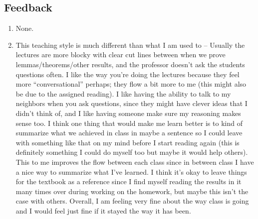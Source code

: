 \documentclass[11pt]{article}
\begin{document}
\subsection*{Feedback}
\begin{enumerate}
    \item None.
    \item This teaching style is much different than what I am used to -- Usually the lectures are more blocky with clear cut lines between when we prove lemmas/theorems/other results, and the professor doesn't ask the students questions often. I like the way you're doing the lectures because they feel more ``conversational'' perhaps; they flow a bit more to me (this might also be due to the assigned reading). I like having the ability to talk to my neighbors when you ask questions, since they might have clever ideas that I didn't think of, and I like having someone make sure my reasoning makes sense too. I think one thing that would make me learn better is to kind of summarize what we achieved in class in maybe a sentence so I could leave with something like that on my mind before I start reading again (this is definitely something I could do myself too but maybe it would help others). This to me improves the flow between each class since in between class I have a nice way to summarize what I've learned. I think it's okay to leave things for the textbook as a reference since I find myself reading the results in it many times over during working on the homework, but maybe this isn't the case with others. Overall, I am feeling very fine about the way class is going and I would feel just fine if it stayed the way it has been.
\end{enumerate}
\end{document}
